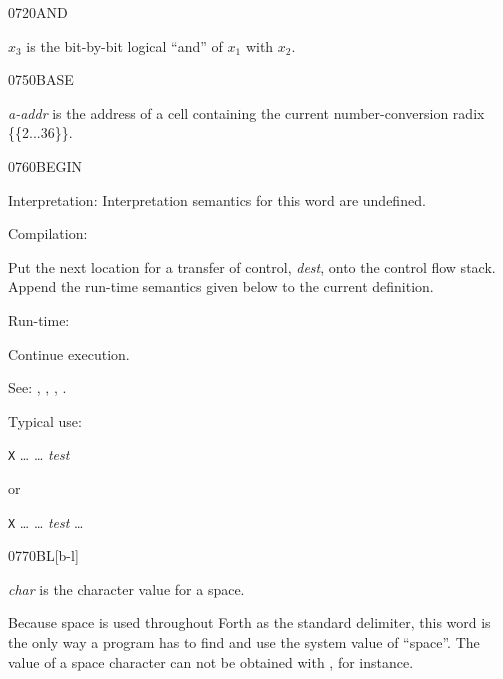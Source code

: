 \begin{newword}{0720}{AND}

	$x_3$ is the bit-by-bit logical ``and'' of $x_1$ with $x_2$.
\end{newword}


\begin{newword}{0750}{BASE}

	\emph{a-addr} is the address of a cell containing the current
	number-conversion radix \{\{2...36\}\}.
\end{newword}


\begin{newword*}{0760}{BEGIN}
\item[Interpretation:]
	Interpretation semantics for this word are undefined.

\item[Compilation:]

	Put the next location for a transfer of control, \emph{dest},
	onto the control flow stack. Append the run-time semantics
	given below to the current definition.

\item[Run-time:]
	\stack{}{}

	Continue execution.

\item[See:]
	,
	,
	,
	.

	\begin{rationale} %
		Typical use:

		\tab \word{:} \texttt{X} {\ldots}
			 {\ldots} \emph{test} 
		\word{;}

		or

		\tab \word{:} \texttt{X} {\ldots}
			 {\ldots}
			\emph{test}  {\ldots}
		\word{;}
	\end{rationale}
\end{newword*}


\begin{newword}{0770}{BL}[b-l]

	\emph{char} is the character value for a space.

	\begin{rationale} %
		Because space is used throughout Forth as the standard
		delimiter, this word is the only way a program has to find and
		use the system value of ``space''. The value of a space
		character can not be obtained with , for instance.
	\end{rationale}
\end{newword}


